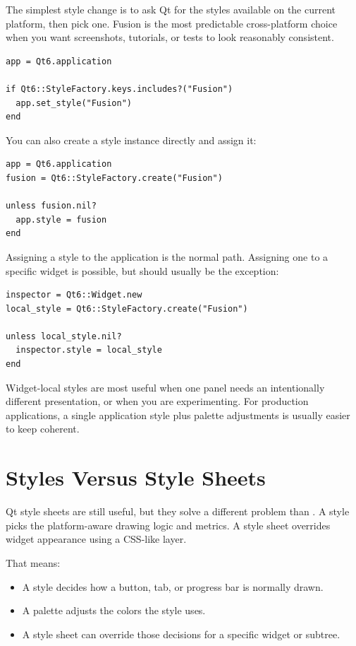 The simplest style change is to ask Qt for the styles available on the current platform, then pick one. Fusion is the most predictable cross-platform choice when you want screenshots, tutorials, or tests to look reasonably consistent.

\begin{lstlisting}[style=crystal]
app = Qt6.application

if Qt6::StyleFactory.keys.includes?("Fusion")
  app.set_style("Fusion")
end
\end{lstlisting}

You can also create a style instance directly and assign it:

\begin{lstlisting}[style=crystal]
app = Qt6.application
fusion = Qt6::StyleFactory.create("Fusion")

unless fusion.nil?
  app.style = fusion
end
\end{lstlisting}

Assigning a style to the application is the normal path. Assigning one to a specific widget is possible, but should usually be the exception:

\begin{lstlisting}[style=crystal]
inspector = Qt6::Widget.new
local_style = Qt6::StyleFactory.create("Fusion")

unless local_style.nil?
  inspector.style = local_style
end
\end{lstlisting}

Widget-local styles are most useful when one panel needs an intentionally different presentation, or when you are experimenting. For production applications, a single application style plus palette adjustments is usually easier to keep coherent.

\section{Styles Versus Style Sheets}

Qt style sheets are still useful, but they solve a different problem than . A style picks the platform-aware drawing logic and metrics. A style sheet overrides widget appearance using a CSS-like layer.

That means:

\begin{itemize}
  \item A style decides how a button, tab, or progress bar is normally drawn.
  \item A palette adjusts the colors the style uses.
  \item A style sheet can override those decisions for a specific widget or subtree.
\end{itemize}

